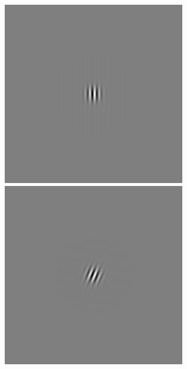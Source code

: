 \begin{figure}[ht]
\begin{center}
 \includegraphics[width=\columnwidth/9]{ch4/figures/rGabor1_0.jpg}
 \includegraphics[width=\columnwidth/9]{ch4/figures/rGabor1_1.jpg}

\end{center}
\end{figure}
